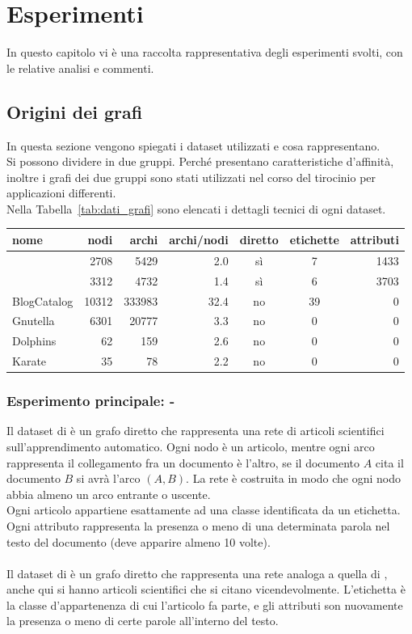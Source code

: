 %
%
\chapter{Esperimenti}\label{chap:3}
In questo capitolo vi è una raccolta rappresentativa degli esperimenti svolti, con le relative analisi e commenti.
\section{Origini dei grafi}
In questa sezione vengono spiegati i dataset utilizzati e cosa rappresentano.\\
Si possono dividere in due gruppi. Perché presentano caratteristiche d'affinità, inoltre i grafi dei due gruppi sono stati utilizzati nel corso del tirocinio per applicazioni differenti.\\
Nella Tabella~\ref{tab:dati_grafi} sono elencati i dettagli tecnici di ogni dataset.
%
\begin{center}
	\begin{tabular}{|l|r|r|r|c|c|r|}
		\hline
		nome&nodi&archi&archi/nodi&diretto&etichette&attributi\\
		\hline
		\cora & 2708 & 5429 & 2.0 & sì & 7 & 1433\\
		\citeseer & 3312 & 4732 & 1.4 & sì & 6 & 3703\\
		\hline
		BlogCatalog & 10312 & 333983 & 32.4 & no & 39 & 0\\
		Gnutella & 6301 & 20777 & 3.3 & no & 0 & 0\\
		Dolphins & 62 & 159 & 2.6 & no & 0 & 0\\
		Karate & 35 & 78 & 2.2 & no & 0 & 0\\
		\hline
		\end{tabular}
		\label{tab:dati_grafi}
\end{center}
%
\subsection*{Esperimento principale: \cora - \citeseer}\cite{Co-Ci_1}\cite{Co-Ci_2}
Il dataset di \textbf{\cora} è un grafo diretto che rappresenta una rete di articoli scientifici sull'apprendimento automatico. Ogni nodo è un articolo, mentre ogni arco rappresenta il collegamento fra un documento è l'altro, se il documento $A$ cita il documento $B$ si avrà l'arco $(A, B)$. La rete è costruita in modo che ogni nodo abbia almeno un arco entrante o uscente.\\
Ogni articolo appartiene esattamente ad una classe identificata da un etichetta. Ogni attributo rappresenta la presenza o meno di una determinata parola nel testo del documento (deve apparire almeno 10 volte).\\
\\
Il dataset di \textbf{\citeseer} è un grafo diretto che rappresenta una rete analoga a quella di \cora, anche qui si hanno articoli scientifici che si citano vicendevolmente. L'etichetta è la classe d'appartenenza di cui l'articolo fa parte, e gli attributi son nuovamente la presenza o meno di certe parole all'interno del testo.\\
%
